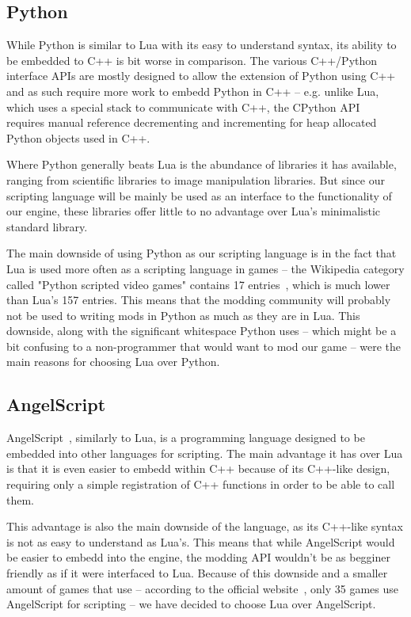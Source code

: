 \subsection{Python}

While Python is similar to Lua with its easy to understand syntax, its ability to be embedded to C++ is bit worse in comparison.
The various C++/Python interface APIs are mostly designed to allow the extension of Python using C++ and as such require more
work to embedd Python in C++ -- e.g. unlike Lua, which uses a special stack to communicate with C++, the CPython API~\cite{CPython}
requires manual reference decrementing and incrementing for heap allocated Python objects used in C++.

Where Python generally beats Lua is the abundance of libraries it has available, ranging from scientific libraries to image manipulation
libraries. But since our scripting language will be mainly be used as an interface to the functionality of our engine, these libraries
offer little to no advantage over Lua's minimalistic standard library.

The main downside of using Python as our scripting language is in the fact that Lua is used more often as a scripting language in games
-- the Wikipedia category called "Python scripted video games" contains 17 entries~\cite{PythonScriptedVGs}, which is much lower
than Lua's 157 entries. This means that the modding community will probably not be used to writing mods in Python as much as they are
in Lua. This downside, along with the significant whitespace Python uses -- which might be a bit confusing to a non-programmer that
would want to mod our game -- were the main reasons for choosing Lua over Python.

\subsection{AngelScript}

AngelScript~\cite{AngelScript}, similarly to Lua, is a programming language designed to be embedded into other languages for scripting.
The main advantage it has over Lua is that it is even easier to embedd within C++ because of its C++-like design, requiring only
a simple registration of C++ functions in order to be able to call them.

This advantage is also the main downside of the language, as its C++-like syntax is not as easy to understand as Lua's. This means that while
AngelScript would be easier to embedd into the engine, the modding API wouldn't be as begginer friendly as if it were interfaced
to Lua. Because of this downside and a smaller amount of games that use -- according to the official website~\cite{AngelScriptGames}, 
only 35 games use AngelScript for scripting -- we have decided to choose Lua over AngelScript.

